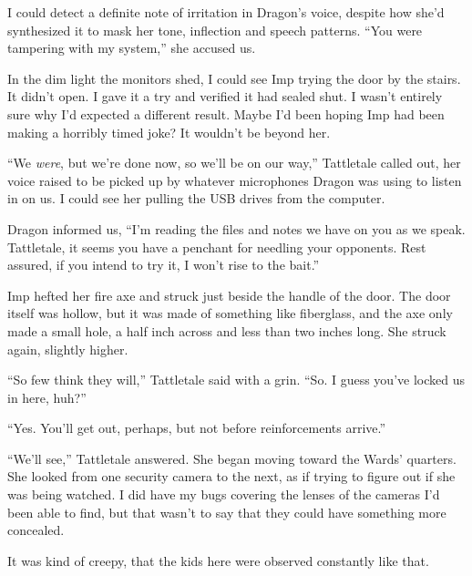 





I could detect a definite note of irritation in Dragon's voice, despite how she'd synthesized it to mask her tone, inflection and speech patterns.  ``You were tampering with my system,'' she accused us.



In the dim light the monitors shed, I could see Imp trying the door by the stairs.  It didn't open.  I gave it a try and verified it had sealed shut.  I wasn't entirely sure why I'd expected a different result.  Maybe I'd been hoping Imp had been making a horribly timed joke?  It wouldn't be beyond her.



``We \emph{were}, but we're done now, so we'll be on our way,'' Tattletale called out, her voice raised to be picked up by whatever microphones Dragon was using to listen in on us.  I could see her pulling the USB drives from the computer.



Dragon informed us,  ``I'm reading the files and notes we have on you as we speak.  Tattletale, it seems you have a penchant for needling your opponents.  Rest assured, if you intend to try it, I won't rise to the bait.''



Imp hefted her fire axe and struck just beside the handle of the door.  The door itself was hollow, but it was made of something like fiberglass, and the axe only made a small hole, a half inch across and less than two inches long.  She struck again, slightly higher.



``So few think they will,'' Tattletale said with a grin.  ``So.  I guess you've locked us in here, huh?''



``Yes.  You'll get out, perhaps, but not before reinforcements arrive.''



``We'll see,'' Tattletale answered.  She began moving toward the Wards' quarters.  She looked from one security camera to the next, as if trying to figure out if she was being watched.  I did have my bugs covering the lenses of the cameras I'd been able to find, but that wasn't to say that they could have something more concealed.



It was kind of creepy, that the kids here were observed constantly like that.



